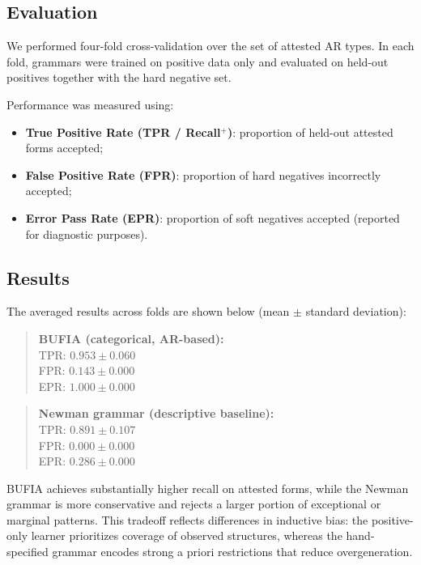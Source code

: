 \documentclass[11pt]{article}
\begin{document}
\subsection{Evaluation}

We performed four-fold cross-validation over the set of attested AR types. In each fold, grammars were trained on positive data only and evaluated on held-out positives together with the hard negative set.

Performance was measured using:
\begin{itemize}
    \item \textbf{True Positive Rate (TPR / Recall$^{+}$)}: proportion of held-out attested forms accepted;
    \item \textbf{False Positive Rate (FPR)}: proportion of hard negatives incorrectly accepted;
    \item \textbf{Error Pass Rate (EPR)}: proportion of soft negatives accepted (reported for diagnostic purposes).
\end{itemize}

\subsection{Results}

The averaged results across folds are shown below (mean $\pm$ standard deviation):

\begin{quote}
\textbf{BUFIA (categorical, AR-based):}\\
TPR: $0.953 \pm 0.060$\\
FPR: $0.143 \pm 0.000$\\
EPR: $1.000 \pm 0.000$
\end{quote}

\begin{quote}
\textbf{Newman grammar (descriptive baseline):}\\
TPR: $0.891 \pm 0.107$\\
FPR: $0.000 \pm 0.000$\\
EPR: $0.286 \pm 0.000$
\end{quote}

BUFIA achieves substantially higher recall on attested forms, while the Newman grammar is more conservative and rejects a larger portion of exceptional or marginal patterns. This tradeoff reflects differences in inductive bias: the positive-only learner prioritizes coverage of observed structures, whereas the hand-specified grammar encodes strong a priori restrictions that reduce overgeneration.
\end{document}
